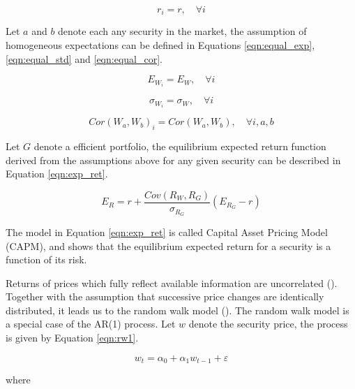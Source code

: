 \documentclass[cic,tc, english]{iiufrgs}
\begin{document}
    \begin{equation}
        \label{eqn:r}
        r_i = r, \quad \forall i
    \end{equation}

    Let $a$ and $b$ denote each any security in the market, the assumption of homogeneous expectations can be defined in Equations \ref{eqn:equal_exp}, \ref{eqn:equal_std} and \ref{eqn:equal_cor}.

    \begin{equation}
        \label{eqn:equal_exp}
        E_{W_i} = E_W, \quad \forall i
    \end{equation}

    \begin{equation}
        \label{eqn:equal_std}
        \sigma_{W_i} = \sigma_W, \quad \forall i
    \end{equation}

    \begin{equation}
        \label{eqn:equal_cor}
        Cor(W_a, W_b)_i = Cor(W_a, W_b), \quad \forall i, a, b
    \end{equation}

    Let $G$ denote a efficient portfolio, the equilibrium expected return function derived from the assumptions above for any given security can be described in Equation \ref{eqn:exp_ret}.

    \begin{equation}
        \label{eqn:exp_ret}
        E_R = r + \frac{Cov(R_W, R_G)}{\sigma_{R_G}} (E_{R_G} - r)
    \end{equation}

    The model in Equation \ref{eqn:exp_ret} is called Capital Asset Pricing Model (CAPM), and shows that the equilibrium expected return for a security is a function of its risk.
    
    Returns of prices which fully reflect available information are uncorrelated (\citet{samuelson1965}). Together with the assumption that successive price changes are identically distributed, it leads us to the random walk model (\citet{fama1970}). The random walk model is a special case of the AR(1) process. Let $w$ denote the security price, the process is given by Equation \ref{eqn:rw1}.
    
    \begin{equation}
        \label{eqn:rw1}
        w_t = \alpha_0 + \alpha_1 w_{t-1} + \varepsilon
    \end{equation}

    where
\end{document}
